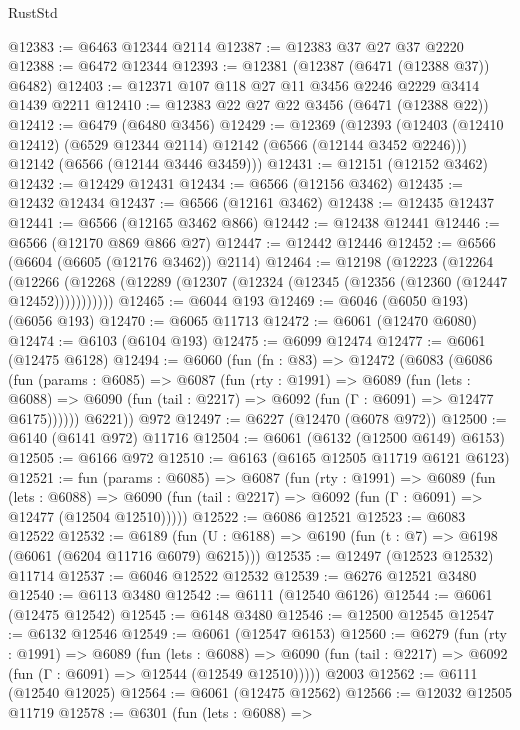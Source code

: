 \begin{lexlean}{RustStd}
\begin{coremodule}
{\begin{coremodule}
{{{{{{{{{{{{{{{{{{{{{{{{{{@12383 := @6463 @12344 @2114
@12387 := @12383 @37 @27 @37 @2220
@12388 := @6472 @12344
@12393 := @12381 (@12387 (@6471 (@12388 @37)) @6482)
@12403 := @12371 @107 @118 @27 @11 @3456 @2246 @2229 @3414 @1439 @2211
@12410 := @12383 @22 @27 @22 @3456 (@6471 (@12388 @22))
@12412 := @6479 (@6480 @3456)
@12429 := @12369
    (@12393
      (@12403 (@12410 @12412) (@6529 @12344 @2114) @12142 (@6566 (@12144 @3452 @2246)))
      @12142
      (@6566 (@12144 @3446 @3459)))
@12431 := @12151 (@12152 @3462)
@12432 := @12429 @12431
@12434 := @6566 (@12156 @3462)
@12435 := @12432 @12434
@12437 := @6566 (@12161 @3462)
@12438 := @12435 @12437
@12441 := @6566 (@12165 @3462 @866)
@12442 := @12438 @12441
@12446 := @6566 (@12170 @869 @866 @27)
@12447 := @12442 @12446
@12452 := @6566 (@6604 (@6605 (@12176 @3462)) @2114)
@12464 := @12198
    (@12223
      (@12264
        (@12266 (@12268 (@12289 (@12307 (@12324 (@12345 (@12356 (@12360 (@12447 @12452)))))))))))
@12465 := @6044 @193
@12469 := @6046 (@6050 @193) (@6056 @193)
@12470 := @6065 @11713
@12472 := @6061 (@12470 @6080)
@12474 := @6103 (@6104 @193)
@12475 := @6099 @12474
@12477 := @6061 (@12475 @6128)
@12494 := @6060
    (fun (fn : @83) =>
    @12472
      (@6083
        (@6086
          (fun (params : @6085) =>
          @6087
            (fun (rty : @1991) =>
            @6089
              (fun (lets : @6088) =>
              @6090 (fun (tail : @2217) => @6092 (fun (Γ : @6091) => @12477 @6175))))))
        @6221))
    @972
@12497 := @6227 (@12470 (@6078 @972))
@12500 := @6140 (@6141 @972) @11716
@12504 := @6061 (@6132 (@12500 @6149) @6153)
@12505 := @6166 @972
@12510 := @6163 (@6165 @12505 @11719 @6121 @6123)
@12521 := fun (params : @6085) =>
  @6087
    (fun (rty : @1991) =>
    @6089
      (fun (lets : @6088) =>
      @6090 (fun (tail : @2217) => @6092 (fun (Γ : @6091) => @12477 (@12504 @12510)))))
@12522 := @6086 @12521
@12523 := @6083 @12522
@12532 := @6189
    (fun (U : @6188) => @6190 (fun (t : @7) => @6198 (@6061 (@6204 @11716 @6079) @6215)))
@12535 := @12497 (@12523 @12532) @11714
@12537 := @6046 @12522 @12532
@12539 := @6276 @12521 @3480
@12540 := @6113 @3480
@12542 := @6111 (@12540 @6126)
@12544 := @6061 (@12475 @12542)
@12545 := @6148 @3480
@12546 := @12500 @12545
@12547 := @6132 @12546
@12549 := @6061 (@12547 @6153)
@12560 := @6279
    (fun (rty : @1991) =>
    @6089
      (fun (lets : @6088) =>
      @6090 (fun (tail : @2217) => @6092 (fun (Γ : @6091) => @12544 (@12549 @12510)))))
    @2003
@12562 := @6111 (@12540 @12025)
@12564 := @6061 (@12475 @12562)
@12566 := @12032 @12505 @11719
@12578 := @6301
    (fun (lets : @6088) =>
}}}}}}}}}}}}}}}}}}}}}}}}}}
\end{coremodule}}
\end{coremodule}
\end{lexlean}
